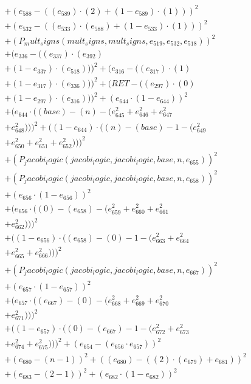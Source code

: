 \documentclass[10pt, a4paper]{article}
\begin{document}
\begin{small}
\begin{align*}
& + (e_{588} - ((e_{589})  \cdot  (2) + (1 - e_{589})  \cdot  (1)))^{2} \\
& + (e_{532} - ((e_{533})  \cdot  (e_{588}) + (1 - e_{533})  \cdot  (1)))^{2} \\
& + (P_mult_signs(mult_signs, mult_signs, e_{519}, e_{532}, e_{518}))^{2} \\
& + (e_{336} - ((e_{337})  \cdot  (e_{392}) \\
& + (1 - e_{337})  \cdot  (e_{518})))^{2} + (e_{316} - ((e_{317})  \cdot  (1) \\
& + (1 - e_{317})  \cdot  (e_{336})))^{2} + (RET - ((e_{297})  \cdot  (0) \\
& + (1 - e_{297})  \cdot  (e_{316})))^{2} + (e_{644}  \cdot  (1 - e_{644}))^{2} \\
& + (e_{644}  \cdot  ((base) - (n) - (e_{645}^{2} + e_{646}^{2} + e_{647}^{2} \\
& + e_{648}^{2})))^{2} + ((1 - e_{644})  \cdot  ((n) - (base) - 1 - (e_{649}^{2} \\
& + e_{650}^{2} + e_{651}^{2} + e_{652}^{2})))^{2} \\
& + (P_jacobi_logic(jacobi_logic, jacobi_logic, base, n, e_{655}))^{2} \\
& + (P_jacobi_logic(jacobi_logic, jacobi_logic, base, n, e_{658}))^{2} \\
& + (e_{656}  \cdot  (1 - e_{656}))^{2} \\
& + (e_{656}  \cdot  ((0) - (e_{658}) - (e_{659}^{2} + e_{660}^{2} + e_{661}^{2} \\
& + e_{662}^{2})))^{2} \\
& + ((1 - e_{656})  \cdot  ((e_{658}) - (0) - 1 - (e_{663}^{2} + e_{664}^{2} \\
& + e_{665}^{2} + e_{666}^{2})))^{2} \\
& + (P_jacobi_logic(jacobi_logic, jacobi_logic, base, n, e_{667}))^{2} \\
& + (e_{657}  \cdot  (1 - e_{657}))^{2} \\
& + (e_{657}  \cdot  ((e_{667}) - (0) - (e_{668}^{2} + e_{669}^{2} + e_{670}^{2} \\
& + e_{671}^{2})))^{2} \\
& + ((1 - e_{657})  \cdot  ((0) - (e_{667}) - 1 - (e_{672}^{2} + e_{673}^{2} \\
& + e_{674}^{2} + e_{675}^{2})))^{2} + (e_{654} - (e_{656}  \cdot  e_{657}))^{2} \\
& + (e_{680} - (n - 1))^{2} + ((e_{680}) - ((2)  \cdot  (e_{679}) + e_{681}))^{2} \\
& + (e_{683} - (2 - 1))^{2} + (e_{682}  \cdot  (1 - e_{682}))^{2} \\

\end{align*}
\end{small}
\end{document}
